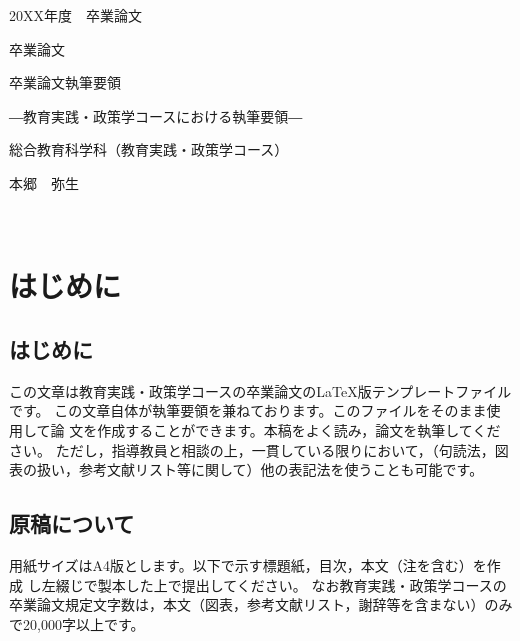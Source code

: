 \documentclass[a4paper,11pt,oneside,openany]{jsbook}
\begin{document}
\thispagestyle{empty}
20XX年度　卒業論文%
\bigskip%
\LARGE%
\begin{center}
卒業論文
\end{center}
\bigskip\bigskip\bigskip\bigskip\bigskip\bigskip\bigskip %
\begin{center} %
卒業論文執筆要領
\end{center}
\Large %
\begin{center}
―教育実践・政策学コースにおける執筆要領―
\end{center}
\bigskip\bigskip\bigskip\bigskip\bigskip\bigskip\bigskip\bigskip\bigskip\bigskip
\bigskip\bigskip\bigskip\bigskip\bigskip\bigskip\bigskip\bigskip\bigskip
\Large %
\begin{center}
 総合教育科学科（教育実践・政策学コース）
\end{center}
\LARGE %
\begin{center}
本郷　弥生
\end{center}
\normalsize
\newpage
\thispagestyle{empty}
　
\newpage
\setcounter{page}{0}

\thispagestyle{empty}
\tableofcontents
\newpage

\setcounter{page}{1}

\chapter{はじめに}
\thispagestyle{empty}

\section{はじめに}
この文章は教育実践・政策学コースの卒業論文の\LaTeX{}版テンプレートファイルです。
この文章自体が執筆要領を兼ねております。このファイルをそのまま使用して論
文を作成することができます。本稿をよく読み，論文を執筆してください。
ただし，指導教員と相談の上，一貫している限りにおいて，（句読法，図表の扱い，参考文献リスト等に関して）他の表記法を使うことも可能です。


\section{原稿について}
用紙サイズはA4版とします。以下で示す標題紙，目次，本文（注を含む）を作成
し左綴じで製本した上で提出してください。
なお教育実践・政策学コースの卒業論文規定文字数は，本文（図表，参考文献リスト，謝辞等を含まない）のみで20,000字以上です。
\end{document}
